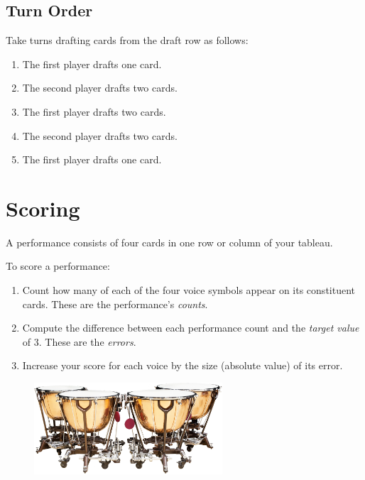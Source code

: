 \documentclass[a6paper, 12pt, parskip=half, DIV=14]{scrartcl}
\begin{document}
\subsection*{Turn Order}
Take turns drafting cards from the draft row as follows:
\begin{enumerate}[leftmargin=4ex]
\item The first player drafts one card.
\item The second player drafts two cards.
\item The first player drafts two cards.
\item The second player drafts two cards.
\item The first player drafts one card.
\end{enumerate}


\newpage
\enlargethispage{1.75\baselineskip}
\section*{Scoring}
A performance consists of four cards in one row or column of your tableau.

To score a performance:
\begin{enumerate}[leftmargin=4ex]
\item Count how many of each of the four voice symbols appear on its constituent cards. These are the performance's \emph{counts}.

\item Compute the difference between each performance count and the \emph{target value} of 3. These are the \emph{errors}.

\item Increase your score for each voice by the size (absolute value) of its error.
\end{enumerate}

\vspace{0.5cm}

\begin{figure}[h]
\centering
\includegraphics[width=7cm]{Images/shutterstock_timpani.jpg}
\end{figure}

\newpage
\enlargethispage{1.75\baselineskip}
\end{document}

